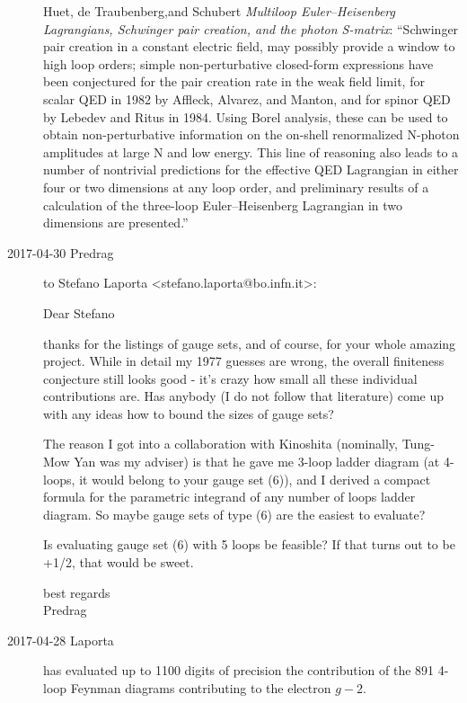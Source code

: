 \begin{description}
Huet, de Traubenberg,and Schubert
{\em Multiloop {Euler--Heisenberg Lagrangians, Schwinger} pair creation,
and the photon {S-matrix}}:
``Schwinger pair creation in a constant electric field, may possibly
provide a window to high loop orders; simple non-perturbative closed-form
expressions have been conjectured for the pair creation rate in the weak
field limit, for scalar QED in 1982 by Affleck, Alvarez, and
Manton, and for spinor QED by Lebedev and
Ritus in 1984. Using Borel analysis, these can be used to
obtain non-perturbative information on the on-shell renormalized N-photon
amplitudes at large N and low energy. This line of reasoning also leads
to a number of nontrivial predictions for the effective QED Lagrangian in
either four or two dimensions at any loop order, and preliminary results
of a calculation of the three-loop Euler--Heisenberg Lagrangian in two
dimensions are presented.''

\newpage
\item[2017-04-30 Predrag] to Stefano Laporta <stefano.laporta@bo.infn.it>:

Dear Stefano

thanks for the listings of gauge sets, and of course, for your whole amazing
project. While in detail my 1977 guesses are wrong, the overall finiteness conjecture
still looks good - it's crazy how small all these individual contributions are.
Has anybody (I do not follow that literature) come up with any ideas how to
bound the sizes of gauge sets?

The reason I got into a collaboration with Kinoshita (nominally, Tung-Mow Yan was
my adviser) is that he gave me 3-loop ladder diagram (at 4-loops, it would belong
to your gauge set (6)), and I derived a compact formula for the parametric
integrand of any number of loops ladder diagram. So maybe gauge sets of type (6)
are the easiest to evaluate?

Is evaluating gauge set (6) with 5 loops be feasible? If that turns out to be
+1/2, that would be sweet.

best regards
\\
Predrag



\item[2017-04-28 Laporta] 
has evaluated up to 1100 digits of precision the contribution of the 891
4-loop Feynman diagrams contributing to the electron $g-2$.

\def\aql#1{a_e^{(#1)}}


\end{description}
